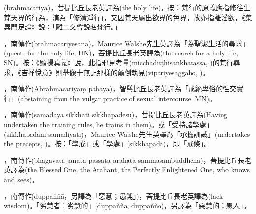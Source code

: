 \startitemgroup[noteitems]
\item{}(brahmacariya)，菩提比丘長老英譯為(the holy life)。按：梵行的原義應指修往生梵天界的行為，演為「修清淨行」，又因梵天屬出欲界的色界，故亦指離淫欲，《集異門足論》說：「離二交會說名梵行。」
\item{}，南傳作(brahmacariyesanā)，Maurice Walshe先生英譯為「為聖潔生活的尋求」(quests for the holy life, DN)，菩提比丘長老英譯為(the search for a holy life, SN)。按：《顯揚真義》說，此指邪見考量(micchādiṭṭhisaṅkhātassa, )的梵行尋求，《吉祥悅意》則舉像十無記那樣的顛倒執見(vipariyesaggāho, )。
\item{}，南傳作(Abrahmacariyaṃ pahāya)，智髻比丘長老英譯為「戒絕卑俗的性交實行」(abstaining from the vulgar practice of sexual intercourse, MN)。
\stopitemgroup

\startitemgroup[noteitems]
\item{}，南傳作(samādāya sikkhati sikkhāpadesu)，菩提比丘長老英譯為(Having undertaken the training rules, he trains in them)。或「受持諸學處」(sikkhāpadāni samādiyati)，Maurice Walshe先生英譯為「承擔訓誡」(undertakes the precepts, )。按：「學戒」或「學處」(sikkhāpada)，即「戒條」。
\stopitemgroup

\startitemgroup[noteitems]
\item{}，南傳作(bhagavatā jānatā passatā arahatā sammāsambuddhena)，菩提比丘長老英譯為(the Blessed One, the Arahant, the Perfectly Enlightened One, who knows and sees)。
\stopitemgroup

\startitemgroup[noteitems]
\item{}，南傳作(duppaññā，另譯為「惡慧；愚鈍」)，菩提比丘長老英譯為(lack wisdom)。「劣慧者；劣慧的」(duppañña, duppañño)，另譯為「惡慧的；愚人」。
\stopitemgroup

